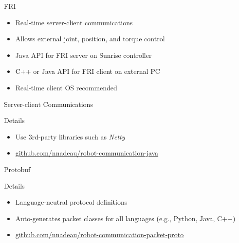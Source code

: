 \documentclass{beamer}
\begin{document}
\begin{frame}{FRI}
  \begin{itemize}
    \item Real-time server-client communications
    \item Allows external joint, position, and torque control
    \item Java API for FRI server on Sunrise controller
    \item C++ or Java API for FRI client on external PC
    \item Real-time client OS recommended
  \end{itemize}
\end{frame}

\begin{frame}{Server-client Communications}

  \begin{block}{Details}
    \begin{itemize}
      \item Use 3rd-party libraries such as \textit{Netty}
      \item \small\url{github.com/nnadeau/robot-communication-java}
    \end{itemize}
  \end{block}
\end{frame}

\begin{frame}{Protobuf}

  \begin{block}{Details}
    \begin{itemize}
      \item Language-neutral protocol definitions
      \item Auto-generates packet classes for all languages (e.g., Python, Java, C++)
      \item \small\url{github.com/nnadeau/robot-communication-packet-proto}
    \end{itemize}
  \end{block}
\end{frame}
\end{document}
